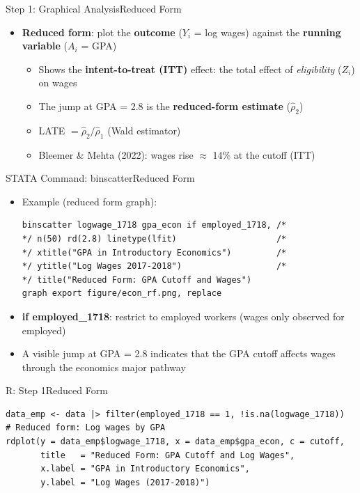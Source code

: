 \documentclass[hyperref={pdfpagelabels=false}]{beamer}
\begin{document}
\begin{frame}{Step 1: Graphical Analysis}{Reduced Form}
	\begin{itemize}
		\item \textbf{Reduced form}: plot the \textbf{outcome} ($Y_i$ = log wages)
		against the \textbf{running variable} ($A_i$ = GPA)
		\vspace{0.2cm}
		\begin{itemize}
			\item Shows the \textbf{intent-to-treat (ITT)} effect:
			the total effect of \emph{eligibility} ($Z_i$) on wages
			\vspace{0.2cm}
			\item The jump at GPA = 2.8 is the \textbf{reduced-form estimate} ($\hat{\rho}_2$)
			\vspace{0.2cm}
			\item LATE $= \hat{\rho}_2 / \hat{\rho}_1$ (Wald estimator)
			\vspace{0.2cm}
			\item Bleemer \& Mehta (2022): wages rise $\approx$ 14\% at the cutoff (ITT)
		\end{itemize}
	\end{itemize}
\end{frame}


\begin{frame}[fragile]{STATA Command: binscatter}{Reduced Form}
	\begin{itemize}
		\item Example (reduced form graph):
\begin{lstlisting}
binscatter logwage_1718 gpa_econ if employed_1718, /*
*/ n(50) rd(2.8) linetype(lfit)                    /*
*/ xtitle("GPA in Introductory Economics")         /*
*/ ytitle("Log Wages 2017-2018")                   /*
*/ title("Reduced Form: GPA Cutoff and Wages")
graph export figure/econ_rf.png, replace
\end{lstlisting}
		\vspace{0.2cm}
		\item \textbf{if employed\_1718}: restrict to employed workers
		(wages only observed for employed)
		\vspace{0.2cm}
		\item A visible jump at GPA = 2.8 indicates that the GPA cutoff
		affects wages through the economics major pathway
	\end{itemize}
\end{frame}


\begin{frame}[fragile]{R: Step 1}{Reduced Form}
\begin{lstlisting}[style=r-style]
data_emp <- data |> filter(employed_1718 == 1, !is.na(logwage_1718))
# Reduced form: Log wages by GPA
rdplot(y = data_emp$logwage_1718, x = data_emp$gpa_econ, c = cutoff,
       title   = "Reduced Form: GPA Cutoff and Log Wages",
       x.label = "GPA in Introductory Economics",
       y.label = "Log Wages (2017-2018)")
\end{lstlisting}
\end{frame}
\end{document}
